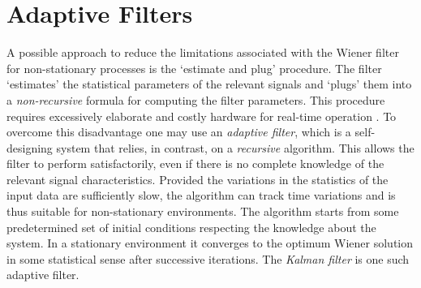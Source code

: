 \begin{table}\centering
{}
\caption{Root-mean-square errors of the Kalman filter and the extended Kalman filter.}
\label{tab:rmse}
\end{table}

\section{Adaptive Filters}

A possible approach to reduce the limitations associated with the Wiener filter for non-stationary processes is the `estimate and plug' procedure. The filter `estimates' the statistical parameters of the relevant signals and `plugs' them into a \emph{non-recursive} formula for computing the filter parameters. This procedure requires excessively elaborate and costly hardware for real-time operation \cite{haykin2002adaptive}. To overcome this disadvantage one may use an \emph{adaptive filter}, which is a self-designing system that relies, in contrast, on a \emph{recursive} algorithm. This allows the filter to perform satisfactorily, even if there is no complete knowledge of the relevant signal characteristics. Provided the variations in the  statistics of the input data are sufficiently slow, the algorithm can track time variations and is thus suitable for non-stationary environments. The algorithm starts from some predetermined set of initial conditions respecting the knowledge about the system. In a stationary environment it converges to the optimum Wiener solution in some statistical sense after successive iterations. The \emph{Kalman filter} is one such adaptive filter.

